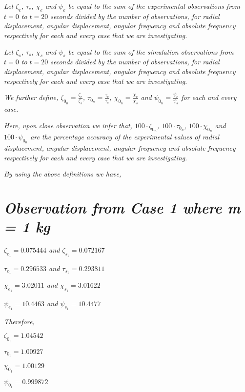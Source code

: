 \textit{Let $\zeta_e$, $\tau_e$, $\chi_e$ and $\psi_e$ be equal to the sum of the experimental observations from $t = 0$ to $t = 20$ seconds divided by the number of observations, for radial displacement, angular displacement, angular frequency and absolute frequency respectively for each and every case that we are investigating.} 

\textit{Let $\zeta_s$, $\tau_s$, $\chi_s$ and $\psi_s$ be equal to the sum of the simulation observations from $t = 0$ to $t = 20$ seconds divided by the number of observations, for radial displacement, angular displacement, angular frequency and absolute frequency respectively for each and every case that we are investigating.}

\textit{We further define, $\zeta_{0_n} = \frac{\zeta_e}{\zeta_s}$, $\tau_{0_n} = \frac{\tau_e}{\tau_s}$, $\chi_{0_n} = \frac{\chi_e}{\chi_s}$ and $\psi_{0_n} = \frac{\psi_e}{\psi_s}$ for each and every case.}

\textit{Here, upon close observation we infer that, $100\cdot\zeta_{0_n}$, $100\cdot\tau_{0_n}$, $100\cdot\chi_{0_n}$ and $100\cdot\psi_{0_n}$ are the percentage accuracy of the experimental values of radial displacement, angular displacement, angular frequency and absolute frequency respectively for each and every case that we are investigating.}

\textit{By using the above definitions we have,}

\section{\textit{Observation from Case 1 where m = 1 kg}}
        
    \textit{$\zeta_{e_1} = 0.075444$ and $\zeta_{s_1} = 0.072167$}
            
    \textit{$\tau_{e_1} = 0.296533$ and $\tau_{s_1} = 0.293811$}
            
    \textit{$\chi_{e_1} = 3.02011$ and $\chi_{s_1} = 3.01622$}
            
    \textit{$\psi_{e_1} = 10.4463$ and $\psi_{s_1} = 10.4477$}
            
    \textit{Therefore,}
            
    $\zeta_{0_1} = 1.04542$
            
    $\tau_{0_1} = 1.00927$
            
    $\chi_{0_1} = 1.00129$
            
    $\psi_{0_1} = 0.999872$    
            
